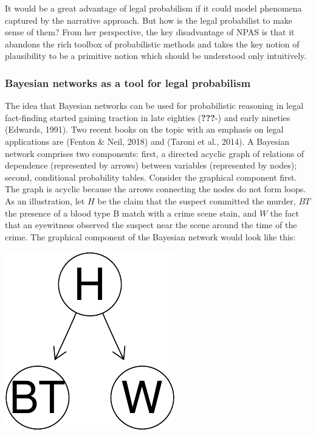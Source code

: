 \documentclass[11pt,dvipsnames,enabledeprecatedfontcommands]{scrartcl}
\begin{document}
It would be a great advantage of legal probabilism if it could model
phenomena captured by the narrative approach. But how is the legal
probabilist to make sense of them? From her perspective, the key
disadvantage of NPAS is that it abandons the rich toolbox of
probabilistic methods and takes the key notion of plausibility to be a
primitive notion which should be understood only intuitively.

\hypertarget{bayesian-networks-as-a-tool-for-legal-probabilism}{%
\subsubsection{Bayesian networks as a tool for legal
probabilism}\label{bayesian-networks-as-a-tool-for-legal-probabilism}}

The idea that Bayesian networks can be used for probabilistic reasoning
in legal fact-finding started gaining traction in late eighties
({\textbf{???}}-) and early nineties (Edwards, 1991). Two recent books
on the topic with an emphasis on legal applications are (Fenton \& Neil,
2018) and (Taroni et al., 2014). A Bayesian network comprises two
components: first, a directed acyclic graph of relations of dependence
(represented by arrows) between variables (represented by nodes);
second, conditional probability tables. Consider the graphical component
first. The graph is acyclic because the arrows connecting the nodes do
not form loops. As an illustration, let \(H\) be the claim that the
suspect committed the murder, \(BT\) the presence of a blood type B
match with a crime scene stain, and \(W\) the fact that an eyewitness
observed the suspect near the scene around the time of the crime. The
graphical component of the Bayesian network would look like this:

\begin{center}\includegraphics{BNfiles/unnamed-chunk-2-1} \end{center}
\end{document}
